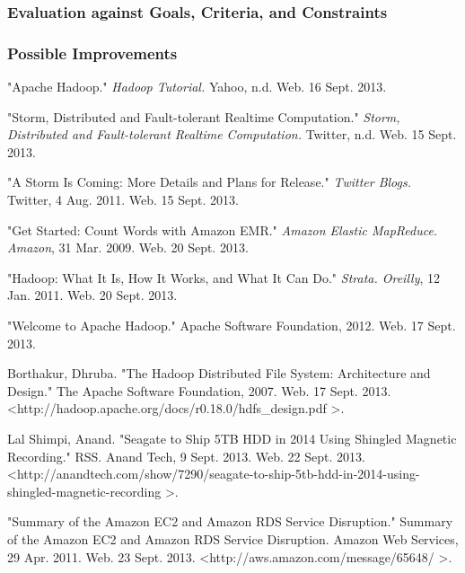 \documentclass[a4paper]{article}
\begin{document}
\subsubsection{Evaluation against Goals, Criteria, and Constraints}
\subsubsection{Possible Improvements}

\clearpage

\begin{thebibliography}{9}

	"Apache Hadoop." {\it Hadoop Tutorial.} Yahoo, n.d. Web. 16 Sept. 2013.

"Storm, Distributed and Fault-tolerant Realtime Computation." {\it Storm, Distributed and Fault-tolerant Realtime Computation.} Twitter, n.d. Web. 15 Sept. 2013.

"A Storm Is Coming: More Details and Plans for Release." {\it Twitter Blogs.} Twitter, 4 Aug. 2011. Web. 15 Sept. 2013.

"Get Started: Count Words with Amazon EMR." {\it Amazon Elastic MapReduce. Amazon}, 31 Mar. 2009. Web. 20 Sept. 2013.

"Hadoop: What It Is, How It Works, and What It Can Do." {\it Strata. Oreilly}, 12 Jan. 2011. Web. 20 Sept. 2013. 

"Welcome to Apache Hadoop." Apache Software Foundation, 2012. Web. 17 Sept. 2013.

Borthakur, Dhruba. "The Hadoop Distributed File System: Architecture and Design." The Apache Software Foundation, 2007. Web. 17 Sept. 2013.
\textless http://hadoop.apache.org/docs/r0.18.0/hdfs\_design.pdf‎ \textgreater.

Lal Shimpi, Anand. "Seagate to Ship 5TB HDD in 2014 Using Shingled Magnetic Recording." RSS. Anand Tech, 9 Sept. 2013. Web. 22 Sept. 2013.
\textless http://anandtech.com/show/7290/seagate-to-ship-5tb-hdd-in-2014-using-shingled-magnetic-recording \textgreater.

"Summary of the Amazon EC2 and Amazon RDS Service Disruption." Summary of the Amazon EC2 and Amazon RDS Service Disruption. Amazon Web Services, 29 Apr. 2011. Web. 23 Sept. 2013. 
\textless http://aws.amazon.com/message/65648/ \textgreater.


\end{thebibliography}
\end{document}
